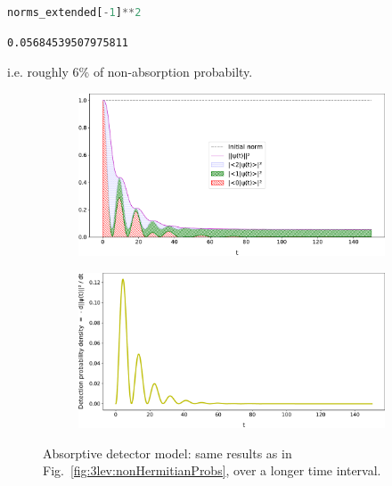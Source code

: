 \begin{lstlisting}[language=Python]
norms_extended[-1]**2
\end{lstlisting}
\begin{lstlisting}
0.05684539507975811
\end{lstlisting}
i.e. roughly 6\% of non-absorption probabilty.
%
\begin{figure}[h]
  \begin{subfigure}[b]{\textwidth}
    \centering
    \includegraphics[width=\textwidth]{img/3ldetect/loss3color_ext.pdf}
    \label{fig:3lev:loss3color_ext}
  \end{subfigure}
  \par\bigskip
  \par\bigskip
  \begin{subfigure}[b]{\textwidth}
    \centering
    \includegraphics[width=\textwidth]{img/3ldetect/loss_ext.pdf}
    \label{fig:3lev:loss_ext}
  \end{subfigure}
  \par\bigskip
  \par\bigskip
  \caption{
    Absorptive detector model: same results as in Fig.~\ref{fig:3lev:nonHermitianProbs},
    over a longer time interval.
  }
  \label{fig:3lev:nonHermitianProbs_ext}
\end{figure}

